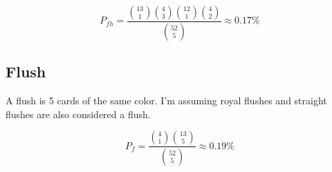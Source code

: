\begin{equation}
	P_{fh} = \frac{\binom{13}{1}\binom{4}{3}\binom{12}{1}\binom{4}{2}}{\binom{52}{5}} \approx 0.17\%
\end{equation}

\subsection{Flush}
A flush is 5 cards of the same color. I'm assuming royal flushes and straight flushes are also considered a flush.

\begin{equation}
	P_{f} = \frac{\binom{4}{1}\binom{13}{5}}{\binom{52}{5}} \approx 0.19\%
\end{equation}